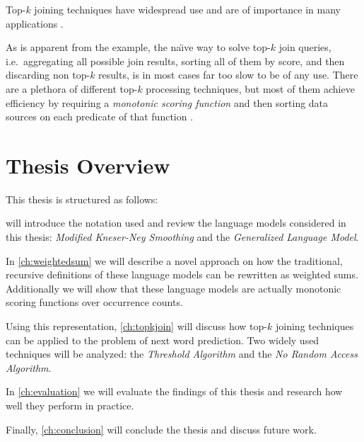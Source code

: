\begin{draft}
Top-$k$ joining techniques have widespread use and are of importance in
many applications \noref.
\end{draft}

As is apparent from the example, the na\"{\i}ve way to solve top-$k$ join
queries, i.e.\ aggregating all possible join results, sorting all of them by
score, and then discarding non top-$k$ results, is in most cases far too
slow to be of any use.
There are a plethora of different top-$k$ processing techniques, but most
of them achieve efficiency by requiring a \emph{monotonic scoring function} and
then sorting data sources on each predicate of that function
\parencite{Ilyas2008}.


\section{Thesis Overview}

This thesis is structured as follows:

 will introduce the notation used and review the language models
considered in this thesis: \emph{Modified Kneser-Ney Smoothing} and the
\emph{Generalized Language Model}.

In \cref{ch:weightedsum} we will describe a novel approach on how the
traditional, recursive definitions of these language models can be rewritten as
weighted sums.
Additionally we will show that these language models are actually monotonic
scoring functions over occurrence counts.

Using this representation, \cref{ch:topkjoin} will discuss how top-$k$ joining
techniques can be applied to the problem of next word prediction.
Two widely used techniques will be analyzed: the \emph{Threshold Algorithm} and
the \emph{No Random Access Algorithm}.

In \cref{ch:evaluation} we will evaluate the findings of this thesis and
research how well they perform in practice.

Finally, \cref{ch:conclusion} will conclude the thesis and discuss future work.
